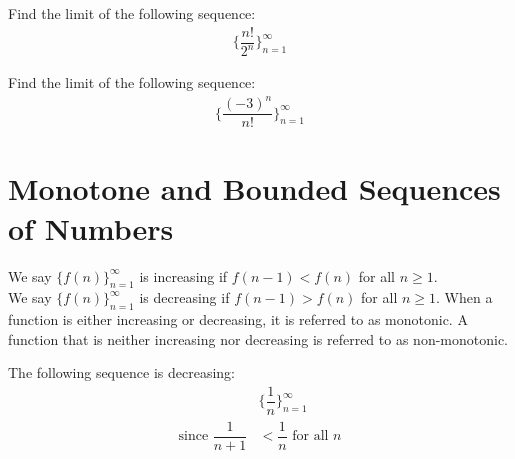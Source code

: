 \begin{exercise}
Find the limit of the following sequence:
\begin{align*}
    \Big\{\dfrac{n!}{2^{n}}\Big\}_{n=1}^{\infty}
\end{align*}
\end{exercise}

\begin{exercise}
Find the limit of the following sequence:
\begin{align*}
    \Big\{\dfrac{(-3)^{n}}{n!}\Big\}_{n=1}^{\infty}
\end{align*}
\end{exercise}

\newpage
\section{Monotone and Bounded Sequences of Numbers}

\begin{definition}
We say $\{f(n)\}_{n=1}^{\infty}$ is increasing if $f(n-1) < f(n)$ for all $n \geq 1$.\\[1ex]
We say $\{f(n)\}_{n=1}^{\infty}$ is decreasing if $f(n-1) > f(n)$ for all $n \geq 1$. When a function is either increasing or decreasing, it is referred to as monotonic. A function that is neither increasing nor decreasing is referred to as non-monotonic.
\end{definition}

\begin{example}
The following sequence is decreasing:
\begin{align*}
    &\Big\{\dfrac{1}{n}\Big\}_{n=1}^{\infty}\\[2ex]
    \text{since} \hspace{4pt} \dfrac{1}{n+1} &< \dfrac{1}{n} \hspace{4pt} \text{for all} \hspace{4pt} n
\end{align*}
\end{example}

